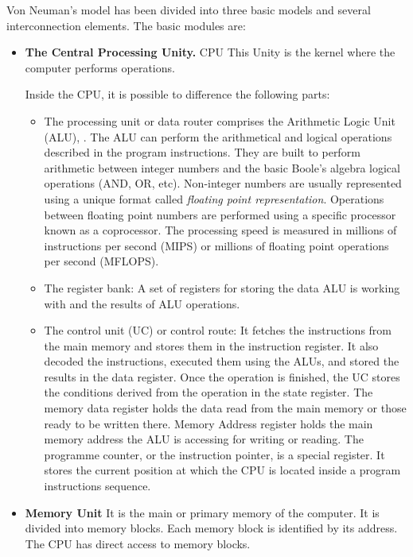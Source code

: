\begin{paracol}{2}
\switchcolumn
Von Neuman's model has been divided into three basic models and several interconnection elements. The basic modules are: 

\begin{itemize}
\item \textbf{The Central Processing Unity.} CPU  This Unity is the kernel where the computer performs operations. 

Inside the CPU, it is possible to difference the following parts:

\begin{itemize}

\item The processing unit or data router comprises the Arithmetic Logic Unit (ALU), . The ALU can perform the arithmetical and logical operations described in the program instructions. They are built to perform arithmetic between integer numbers and the basic Boole's algebra logical operations (AND, OR, etc). Non-integer numbers are usually represented using a unique format called \emph{floating point representation}. Operations between floating point numbers are performed using a specific processor known as a coprocessor. The processing speed is measured in millions of instructions per second (MIPS) or millions of floating point operations per second (MFLOPS).

\item The register bank: A set of registers for storing the data ALU is working with and the results of ALU operations.
 
\item The control unit (UC) or control route: It fetches the instructions from the main memory and stores them in the instruction register. It also decoded the instructions, executed them using the ALUs, and stored the results in the data register. Once the operation is finished, the UC stores the conditions derived from the operation in the state register. The memory data register holds the data read from the main memory or those ready to be written there. Memory Address register holds the main memory address the ALU is accessing for writing or reading. The programme counter, or the instruction pointer, is a special register. It stores the current position at which the CPU is located inside a program instructions sequence.    
\end{itemize}
 

\item \textbf{Memory Unit} It is the main or primary memory of the computer. It is divided into memory blocks. Each memory block is identified by its address. The CPU has direct access to memory blocks.


\end{itemize}
\end{paracol}
